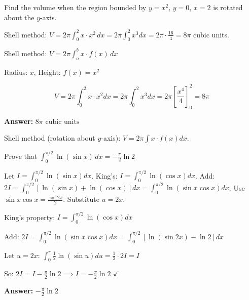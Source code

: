 \vspace{1cm}

\begin{problem}
Find the volume when the region bounded by $y = x^2$, $y = 0$, $x = 2$ is rotated about the $y$-axis.
\end{problem}

\begin{hint}
Shell method: $V = 2\pi\int_0^2 x \cdot x^2 \, dx = 2\pi\int_0^2 x^3 dx = 2\pi \cdot \frac{16}{4} = 8\pi$ cubic units.
\end{hint}

\begin{solution}
Shell method: $V = 2\pi\int_a^b x\cdot f(x)\,dx$

Radius: $x$, Height: $f(x)=x^2$

\[
V = 2\pi\int_0^2 x \cdot x^2dx = 2\pi\int_0^2 x^3dx = 2\pi\left[\frac{x^4}{4}\right]_0^2 = 8\pi
\]

\textbf{Answer:} $\boxed{8\pi \text{ cubic units}}$
\end{solution}

\begin{takeaways}
Shell method (rotation about $y$-axis): $V=2\pi\int x\cdot f(x)dx$.
\end{takeaways}

\vspace{1cm}

\begin{problem}
Prove that $\displaystyle \int_0^{\pi/2} \ln(\sin x) \, dx = -\frac{\pi}{2}\ln 2$
\end{problem}

\begin{hint}
Let $I = \int_0^{\pi/2} \ln(\sin x)dx$. King's: $I = \int_0^{\pi/2}\ln(\cos x)dx$. Add: $2I = \int_0^{\pi/2}[\ln(\sin x) + \ln(\cos x)]dx = \int_0^{\pi/2}\ln(\sin x\cos x)dx$. Use $\sin x\cos x = \frac{\sin 2x}{2}$. Substitute $u = 2x$.
\end{hint}

\begin{solution}
King's property: $I = \int_0^{\pi/2}\ln(\cos x)dx$

Add: $2I = \int_0^{\pi/2}\ln(\sin x\cos x)dx = \int_0^{\pi/2}[\ln(\sin 2x) - \ln 2]dx$

Let $u=2x$: $\int_0^{\pi}\frac{1}{2}\ln(\sin u)du = \frac{1}{2} \cdot 2I = I$

So: $2I = I - \frac{\pi}{2}\ln 2 \implies I = -\frac{\pi}{2}\ln 2$ $\checkmark$

\textbf{Answer:} $\boxed{-\frac{\pi}{2}\ln 2}$
\end{solution}

